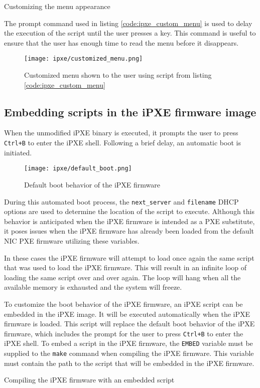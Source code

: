 \documentclass[../main.tex]{subfiles}
\begin{document}
\begin{listing}[H]
  \caption{Customizing the menu appearance}
  \label{code:ipxe_custom_menu}
\end{listing}

The prompt command used in listing \ref{code:ipxe_custom_menu} is used to delay the execution of the script until the user presses a key.
This command is useful to ensure that the user has enough time to read the menu before it disappears.

\begin{figure}[H]
  \centering
  \texttt{[image: ipxe/customized\_menu.png]}
  \caption{Customized menu shown to the user using script from listing \ref{code:ipxe_custom_menu}}
  \label{fig:ipxe_custom_menu}
\end{figure}

\subsection{Embedding scripts in the iPXE firmware image}

When the unmodified iPXE binary is executed, it prompts the user to press \texttt{Ctrl+B} to enter the iPXE shell. Following a brief delay, an automatic boot is initiated.

\begin{figure}[H]
  \centering
  \texttt{[image: ipxe/default\_boot.png]}
  \caption{Default boot behavior of the iPXE firmware}
\end{figure}

During this automated boot process, the \texttt{next\_server} and \texttt{filename} DHCP options are used to determine the location of the script to execute.
Although this behavior is anticipated when the iPXE firmware is intended as a PXE substitute, it poses issues when the iPXE firmware has already been loaded from the default NIC PXE firmware utilizing these variables.

In these cases the iPXE firmware will attempt to load once again the same script that was used to load the iPXE firmware. This will result in an infinite loop of loading the same script over and over again.
The loop will hang when all the available memory is exhausted and the system will freeze.

To customize the boot behavior of the iPXE firmware, an iPXE script can be embedded in the iPXE image. It will be executed automatically when the iPXE firmware is loaded.
This script will replace the default boot behavior of the iPXE firmware, which includes the prompt for the user to press \texttt{Ctrl+B} to enter the iPXE shell.
To embed a script in the iPXE firmware, the \texttt{EMBED} variable must be supplied to the \texttt{make} command when compiling the iPXE firmware.
This variable must contain the path to the script that will be embedded in the iPXE firmware.

\begin{listing}[H]
  \caption{Compiling the iPXE firmware with an embedded script}
\end{listing}
\end{document}
